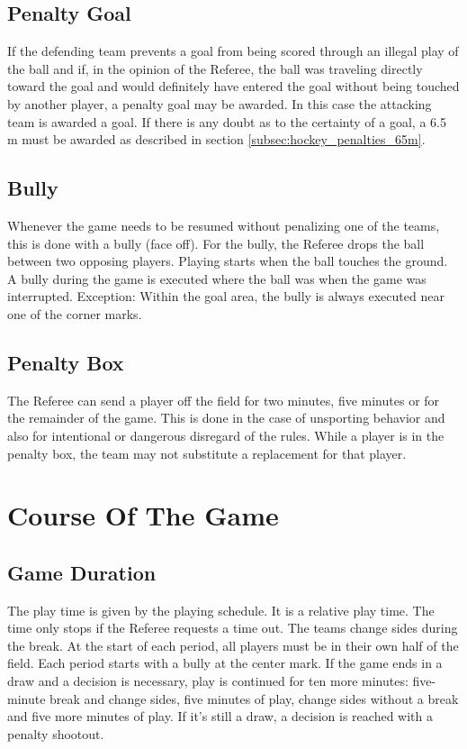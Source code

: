 \subsection{Penalty Goal}
If the defending team prevents a goal from being scored through an illegal play of the ball and if, in the opinion of the Referee, the ball was traveling directly toward the goal and would definitely have entered the goal without being touched by another player, a penalty goal may be awarded.
In this case the attacking team is awarded a goal.
If there is any doubt as to the certainty of a goal, a 6.5 m must be awarded as described in section \ref{subsec:hockey_penalties_65m}.

\subsection{Bully \label{subsec:hockey_penalties_bully}}
Whenever the game needs to be resumed without penalizing one of the teams, this is done with a bully (face off).
For the bully, the Referee drops the ball between two opposing players.
Playing starts when the ball touches the ground.
A bully during the game is executed where the ball was when the game was interrupted. 
Exception: Within the goal area, the bully is always executed near one of the corner marks.

\subsection{Penalty Box}
The Referee can send a player off the field for two minutes, five minutes or for the remainder of the game.
This is done in the case of unsporting behavior and also for intentional or dangerous disregard of the rules.
While a player is in the penalty box, the team may not substitute a replacement for that player.

\section{Course Of The Game}

\subsection{Game Duration}
The play time is given by the playing schedule.
It is a relative play time.
The time only stops if the Referee requests a time out.
The teams change sides during the break.
At the start of each period, all players must be in their own half of the field.
Each period starts with a bully at the center mark.
If the game ends in a draw and a decision is necessary, play is continued for ten more minutes: five-minute break and change sides, five minutes of play, change sides without a break and five more minutes of play.
If it's still a draw, a decision is reached with a penalty shootout.

